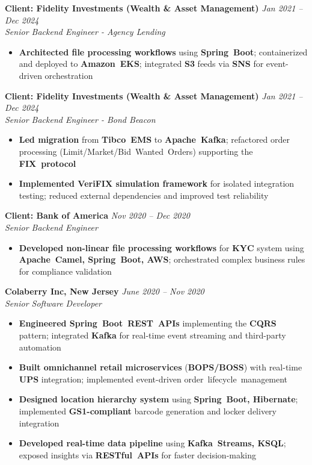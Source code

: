 \documentclass[11pt,a4paper]{article}
\newcommand{\resumeItem}[1]{\item\small{#1}}
\newcommand{\resumeItemList}[1]{\begin{itemize}[leftmargin=0.5in, itemsep=0.25em, parsep=0pt, partopsep=0pt, topsep=0.25em]
    \small
    #1
\end{itemize}}
\begin{document}
\textbf{Client: Fidelity Investments (Wealth \& Asset Management)} \hfill \textit{Jan 2021 -- Dec 2024}\\
\textit{Senior Backend Engineer - Agency Lending}
\resumeItemList{
    \resumeItem{\textbf{Architected file processing workflows} using \textbf{Spring~Boot}; containerized and deployed to \textbf{Amazon~EKS}; integrated \textbf{S3} feeds via \textbf{SNS} for event-driven orchestration}
}
\vspace{0.4em}

\textbf{Client: Fidelity Investments (Wealth \& Asset Management)} \hfill \textit{Jan 2021 -- Dec 2024}\\
\textit{Senior Backend Engineer - Bond Beacon}
\resumeItemList{
    \resumeItem{\textbf{Led migration} from \textbf{Tibco~EMS} to \textbf{Apache~Kafka}; refactored order processing (Limit/Market/Bid~Wanted~Orders) supporting the \textbf{FIX~protocol}}
    \resumeItem{\textbf{Implemented \textbf{VeriFIX} simulation framework} for isolated integration testing; reduced external dependencies and improved test reliability}
}
\vspace{0.4em}

\textbf{Client: Bank of America} \hfill \textit{Nov 2020 -- Dec 2020}\\
\textit{Senior Backend Engineer}
\resumeItemList{
    \resumeItem{\textbf{Developed non-linear file processing workflows} for \textbf{KYC} system using \textbf{Apache~Camel, Spring~Boot, AWS}; orchestrated complex business rules for compliance validation}
}

\textbf{Colaberry Inc, New Jersey} \hfill \textit{June 2020 -- Nov 2020}\\
\textit{Senior Software Developer}
\resumeItemList{
    \resumeItem{\textbf{Engineered Spring~Boot~REST~APIs} implementing the \textbf{CQRS} pattern; integrated \textbf{Kafka} for real-time event streaming and third-party automation}
    \resumeItem{\textbf{Built omnichannel retail microservices} (\textbf{BOPS/BOSS}) with real-time \textbf{UPS} integration; implemented event-driven order~lifecycle~management}
    \resumeItem{\textbf{Designed location hierarchy system} using \textbf{Spring~Boot, Hibernate}; implemented \textbf{GS1-compliant} barcode generation and locker delivery integration}
    \resumeItem{\textbf{Developed real-time data pipeline} using \textbf{Kafka~Streams, KSQL}; exposed insights via \textbf{RESTful~APIs} for faster decision-making}
}
\vspace{0.4em}
\end{document}
